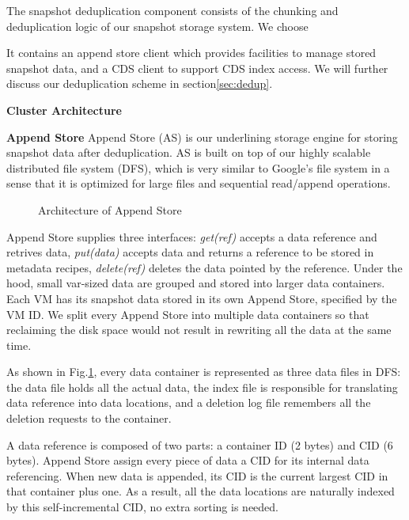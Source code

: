 The snapshot deduplication component consists of the chunking and deduplication 
logic of our snapshot storage system. We choose 

It contains an append store client which provides facilities to manage stored snapshot data, and a CDS client to support CDS index access. We will further discuss our deduplication scheme in section\ref{sec:dedup}.

{\bf Cluster Architecture}

{\bf Append Store}
Append Store (AS) is our underlining storage engine for storing snapshot data after deduplication. 
AS is built on top of our highly scalable distributed file system (DFS), 
which is very similar to Google's file system
in a sense that it is optimized for large files and sequential read/append operations.

\begin{figure}[htbp]
  \centering
  \caption{Architecture of Append Store}
  \label{fig:as_arch}
\end{figure}

Append Store supplies three interfaces: {\em get(ref)} accepts a data reference and retrives data, 
{\em put(data)} accepts data and returns a reference to be stored in metadata recipes, 
{\em delete(ref)} 
deletes the data pointed by the reference.
Under the hood, small var-sized data are grouped and stored into larger data containers. Each VM has
its snapshot data stored in its own Append Store, specified by the VM ID. 
We split every Append Store into multiple data containers so that reclaiming the disk space would not 
result in rewriting all the data at the same time.

As shown in Fig.\ref{fig:as_arch}, every data container is represented as three data files in DFS:
the data file holds all the actual data, the index file is responsible for translating data reference
into data locations, and a deletion log file remembers all the deletion requests to the container.

A data reference is composed of two parts: a container ID (2 bytes) and CID (6 bytes).
Append Store assign every piece of data a CID for its internal data referencing. 
When new data is appended, its CID is the current largest CID in that container plus one.
As a result, all the data locations are naturally indexed by this self-incremental CID, 
no extra sorting is needed.


